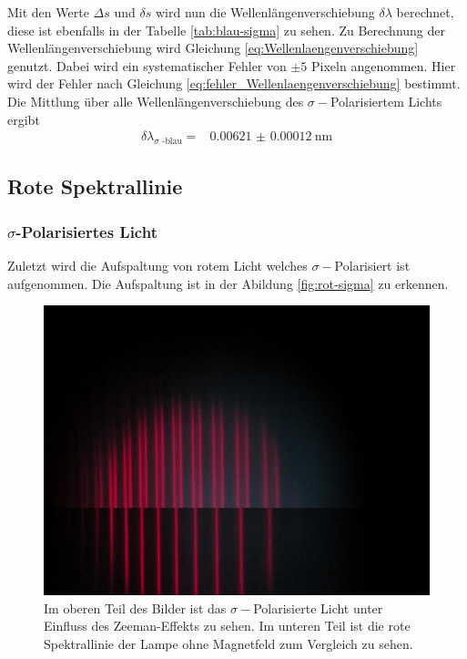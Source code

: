 Mit den Werte $\Delta s$ und $\delta s$ wird nun die Wellenlängenverschiebung $\delta \lambda$ berechnet, diese ist ebenfalls in der Tabelle \autoref{tab:blau-sigma} zu sehen.
Zu Berechnung der Wellenlängenverschiebung wird Gleichung \eqref{eq:Wellenlaengenverschiebung} genutzt.
Dabei wird ein systematischer Fehler von $\pm 5$ Pixeln angenommen. 
Hier wird der Fehler nach Gleichung \eqref{eq:fehler_Wellenlaengenverschiebung} bestimmt.
Die Mittlung über alle Wellenlängenverschiebung des $\sigma -$Polarisiertem Lichts ergibt
\begin{align*}
    \delta \lambda _\text{$\sigma$ -blau} =& \SI{0.00621(012)}{\nano\meter}
\end{align*}

\subsection{Rote Spektrallinie}
\subsubsection{\boldmath\texorpdfstring{$\sigma$}{sigma}-Polarisiertes Licht}
Zuletzt wird die Aufspaltung von rotem Licht welches $\sigma -$Polarisiert ist aufgenommen.
Die Aufspaltung ist in der Abildung \autoref{fig:rot-sigma} zu erkennen.

\begin{figure}
    \centering
    \includegraphics[width=\textwidth]{content/data/Rot_0_sigma_uebernander.JPG}
    \caption{Im oberen Teil des Bilder ist das $\sigma -$Polarisierte Licht unter Einfluss des Zeeman-Effekts zu sehen. Im unteren Teil ist die rote Spektrallinie der Lampe ohne Magnetfeld zum Vergleich zu sehen.}
    \label{fig:rot-sigma}
\end{figure}

